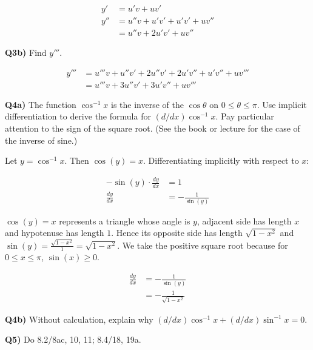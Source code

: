 \documentclass[9pt]{article}
\begin{document}
\begin{align*}
  y' &= u'v + uv'\\
  y'' &= u''v + u'v' + u'v' + uv''\\
      &= u''v + 2u'v' + uv''
\end{align*}


\begin{tcolorbox}
  \textbf{Q3b)} Find $y'''$.
\end{tcolorbox}

\begin{align*}
  y''' &= u'''v + u''v' + 2u''v' + 2u'v'' + u'v'' + uv'''\\
       &= u'''v + 3u''v' + 3u'v'' + uv'''
\end{align*}


\begin{tcolorbox}
  \textbf{Q4a)} The function $\cos^{-1}x$ is the inverse of the $\cos\theta$ on $0 \leq \theta \leq \pi$. Use implicit differentiation to derive the formula for $(d/dx)\cos^{-1}x$. Pay particular attention to the sign of the square root. (See the book or lecture for the case of the inverse of sine.)
\end{tcolorbox}

Let $y = \cos^{-1}x$. Then $\cos(y) = x$. Differentiating implicitly with respect to $x$:

\begin{align*}
  -\sin(y) \cdot \frac{dy}{dx} &= 1\\
  \frac{dy}{dx} &= -\frac{1}{\sin(y)}
\end{align*}

$\cos(y) = x$ represents a triangle whose angle is $y$, adjacent side has length $x$ and hypotenuse has length $1$. Hence its opposite side has length $\sqrt{1 - x^2}$ and $\sin(y) = \frac{\sqrt{1 - x^2}}{1} = \sqrt{1 - x^2}$. We take the positive square root because for $0 \leq x \leq \pi$, $\sin(x) \geq 0$.

\begin{align*}
  \frac{dy}{dx} &= -\frac{1}{\sin(y)}\\
                &= -\frac{1}{\sqrt{1 - x^2}}
\end{align*}


\begin{tcolorbox}
  \textbf{Q4b)} Without calculation, explain why $(d/dx)\cos^{-1}x + (d/dx)\sin^{-1}x = 0$.
\end{tcolorbox}


\begin{tcolorbox}
  \textbf{Q5)} Do 8.2/8ac, 10, 11; 8.4/18, 19a.
\end{tcolorbox}
\end{document}
